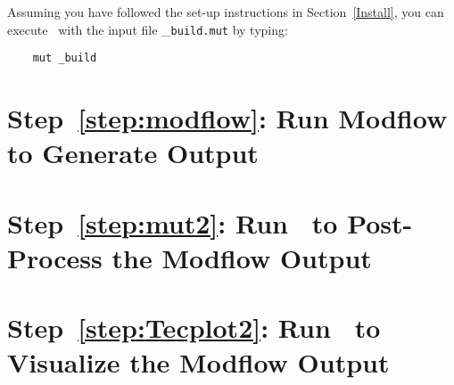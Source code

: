 Assuming you have followed the set-up instructions in Section~\ref{Install}, you can execute \mut\ with the input file \_\verb+build.mut+ by typing:
\begin{verbatim}
    mut _build
\end{verbatim}




\section*{Step~\ref{step:modflow}: Run Modflow to Generate Output}
\section*{Step~\ref{step:mut2}: Run \mut\ to Post-Process the Modflow Output}
\section*{Step~\ref{step:Tecplot2}: Run \tecplot\ to Visualize the Modflow Output}

